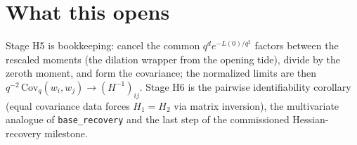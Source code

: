 \documentclass[11pt]{article}
\begin{document}
\section{What this opens}

Stage H5 is bookkeeping: cancel the common $q^d e^{-L(0)/q^2}$
factors between the rescaled moments (the dilation wrapper from the
opening tide), divide by the zeroth moment, and form the covariance;
the normalized limits are then $q^{-2}\,\mathrm{Cov}_q(w_i, w_j) \to
(H^{-1})_{ij}$. Stage H6 is the pairwise identifiability corollary
(equal covariance data forces $H_1 = H_2$ via matrix inversion), the
multivariate analogue of \texttt{base\_recovery} and the last step
of the commissioned Hessian-recovery milestone.
\end{document}
